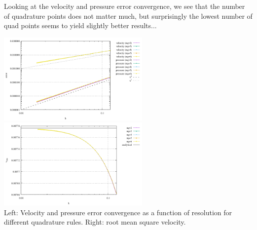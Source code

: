 Looking at the velocity and pressure error convergence, we see that the number of quadrature
points does not matter much, but surprisingly the lowest number of quad points seems to yield slightly
better results...
\begin{center}
\includegraphics[width=7.4cm]{python_codes/fieldstone_80/results/dh/errors}
\includegraphics[width=7.4cm]{python_codes/fieldstone_80/results/dh/vrms}\\
{\captionfont Left: Velocity and pressure error convergence as a function of resolution for 
different quadrature rules. Right: root mean square velocity.}
\end{center}

